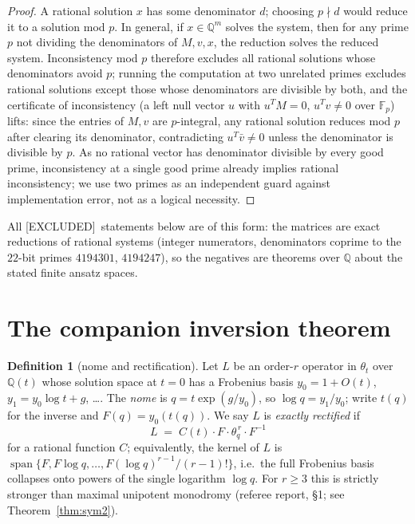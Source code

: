 \documentclass[11pt,reqno]{amsart}
\theoremstyle{plain}
\theoremstyle{definition}
\newtheorem{definition}[theorem]{Definition}
\theoremstyle{remark}
\newcommand{\Q}{\mathbb{Q}}
\newcommand{\thq}{\theta_q}
\newcommand{\tht}{\theta_t}
\newcommand{\Excluded}{\textup{\textsf{[EXCLUDED]}}}
\begin{document}
\begin{proof}
A rational solution $x$ has some denominator $d$; choosing $p\nmid d$
would reduce it to a solution mod $p$. In general, if $x\in\Q^m$ solves
the system, then for any prime $p$ not dividing the denominators of
$M,v,x$, the reduction solves the reduced system. Inconsistency mod $p$
therefore excludes all rational solutions whose denominators avoid $p$;
running the computation at two unrelated primes excludes rational
solutions except those whose denominators are divisible by both, and the
certificate of inconsistency (a left null vector $u$ with $u^TM=0$,
$u^Tv\ne0$ over $\mathbb F_p$) lifts: since the entries of $M,v$ are
$p$-integral, any rational solution reduces mod $p$ after clearing its
denominator, contradicting $u^T\bar v\neq0$ unless the denominator is
divisible by $p$. As no rational vector has denominator divisible by
every good prime, inconsistency at a single good prime already implies
rational inconsistency; we use two primes as an independent guard against
implementation error, not as a logical necessity.
\end{proof}

All \Excluded\ statements below are of this form: the matrices are exact
reductions of rational systems (integer numerators, denominators coprime
to the $22$-bit primes $4194301$, $4194247$), so the negatives are
theorems over $\Q$ about the stated finite ansatz spaces.

\section{The companion inversion theorem}\label{sec:core}

\begin{definition}[nome and rectification]\label{def:nome}
Let $L$ be an order-$r$ operator in $\tht$ over $\Q(t)$ whose solution
space at $t=0$ has a Frobenius basis $y_0=1+O(t)$,
$y_1=y_0\log t+g$, \dots. The \emph{nome} is $q=t\exp(g/y_0)$, so
$\log q=y_1/y_0$; write $t(q)$ for the inverse and $F(q)=y_0(t(q))$. We
say $L$ is \emph{exactly rectified} if
\begin{equation}\label{eq:rect}
L\;=\;C(t)\cdot F\cdot\thq^{\,r}\cdot F^{-1}
\end{equation}
for a rational function $C$; equivalently, the kernel of $L$ is
$\operatorname{span}\{F,F\log q,\dots,F(\log q)^{r-1}/(r-1)!\}$, i.e.\ the
full Frobenius basis collapses onto powers of the single logarithm
$\log q$. For $r\ge3$ this is strictly stronger than maximal unipotent
monodromy (referee report, \S1; see Theorem~\ref{thm:sym2}).
\end{definition}
\end{document}

